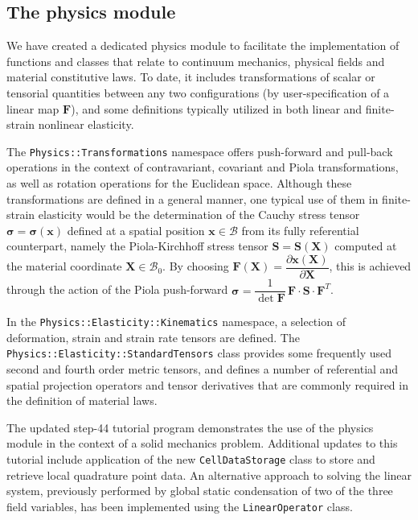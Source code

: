 \documentclass{ansarticle-preprint}
\begin{document}
\subsection{The physics module}
\label{sec:physics}

We have created a dedicated physics module to facilitate the
implementation of functions and classes that relate to continuum mechanics,
physical fields and material constitutive laws. To date, it includes
transformations of scalar or tensorial quantities between any two
configurations (by user-specification of a linear map $\mathbf{F}$), and some
definitions typically utilized in both linear and finite-strain nonlinear
elasticity.

The \verb!Physics::Transformations! namespace offers push-forward and
pull-back operations in the context of contravariant, covariant and Piola
transformations, as well as rotation operations for the Euclidean space.
Although these transformations are defined in a general manner, one typical
use of them in finite-strain elasticity would be the determination of the
Cauchy stress tensor $\boldsymbol{\sigma} = \boldsymbol{\sigma}\left(\mathbf{x}\right)$
defined at a spatial position $\mathbf{x} \in \mathcal{B}$ from its
fully referential counterpart, namely the Piola-Kirchhoff stress tensor
$\mathbf{S} = \mathbf{S}\left(\mathbf{X}\right)$ computed at the material
coordinate $\mathbf{X} \in \mathcal{B}_{0}$.
By choosing
$\mathbf{F} \left(\mathbf{X}\right) = \dfrac{\partial \mathbf{x}\left(\mathbf{X}\right)}{\partial \mathbf{X}}$,
this is achieved through the action of the Piola push-forward
$\boldsymbol{\sigma} = \dfrac{1}{\det \mathbf{F}} \, \mathbf{F} \cdot \mathbf{S} \cdot \mathbf{F}^{T}$.

In the \verb!Physics::Elasticity::Kinematics! namespace, a selection of
deformation, strain and strain rate tensors are defined. The
\verb!Physics::Elasticity::StandardTensors! class provides some frequently
used second and fourth order metric tensors, and defines a number of
referential and spatial projection operators and tensor derivatives that
are commonly required in the definition of material laws.

The updated step-44 tutorial program demonstrates the
use of the physics module in the context of a solid mechanics problem.
Additional updates to this tutorial include application of the new 
\texttt{CellDataStorage} class to store and retrieve local quadrature point 
data. An alternative approach to solving the linear system, previously 
performed by global static condensation of two of the three field variables, 
has been implemented using the \texttt{LinearOperator} class. 
\end{document}

